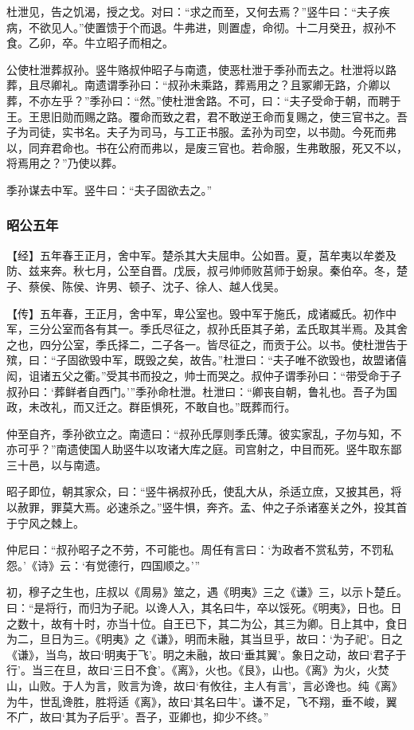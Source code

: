 \documentclass[]{article}
\begin{document}
杜泄见，告之饥渴，授之戈。对曰：``求之而至，又何去焉？''竖牛曰：``夫子疾病，不欲见人。''使置馈于个而退。牛弗进，则置虚，命彻。十二月癸丑，叔孙不食。乙卯，卒。牛立昭子而相之。

公使杜泄葬叔孙。竖牛赂叔仲昭子与南遗，使恶杜泄于季孙而去之。杜泄将以路葬，且尽卿礼。南遗谓季孙曰：``叔孙未乘路，葬焉用之？且冢卿无路，介卿以葬，不亦左乎？''季孙曰：``然。''使杜泄舍路。不可，曰：``夫子受命于朝，而聘于王。王思旧勋而赐之路。覆命而致之君，君不敢逆王命而复赐之，使三官书之。吾子为司徒，实书名。夫子为司马，与工正书服。孟孙为司空，以书勋。今死而弗以，同弃君命也。书在公府而弗以，是废三官也。若命服，生弗敢服，死又不以，将焉用之？''乃使以葬。

季孙谋去中军。竖牛曰：``夫子固欲去之。''

\hypertarget{header-n2443}{%
\subsubsection{昭公五年}\label{header-n2443}}

【经】五年春王正月，舍中军。楚杀其大夫屈申。公如晋。夏，莒牟夷以牟娄及防、兹来奔。秋七月，公至自晋。戊辰，叔弓帅师败莒师于蚡泉。秦伯卒。冬，楚子、蔡侯、陈侯、许男、顿子、沈子、徐人、越人伐吴。

【传】五年春，王正月，舍中军，卑公室也。毁中军于施氏，成诸臧氏。初作中军，三分公室而各有其一。季氏尽征之，叔孙氏臣其子弟，孟氏取其半焉。及其舍之也，四分公室，季氏择二，二子各一。皆尽征之，而贡于公。以书。使杜泄告于殡，曰：``子固欲毁中军，既毁之矣，故告。''杜泄曰：``夫子唯不欲毁也，故盟诸僖闳，诅诸五父之衢。''受其书而投之，帅士而哭之。叔仲子谓季孙曰：``带受命于子叔孙曰：`葬鲜者自西门。'''季孙命杜泄。杜泄曰：``卿丧自朝，鲁礼也。吾子为国政，未改礼，而又迁之。群臣惧死，不敢自也。''既葬而行。

仲至自齐，季孙欲立之。南遗曰：``叔孙氏厚则季氏薄。彼实家乱，子勿与知，不亦可乎？''南遗使国人助竖牛以攻诸大库之庭。司宫射之，中目而死。竖牛取东鄙三十邑，以与南遗。

昭子即位，朝其家众，曰：``竖牛祸叔孙氏，使乱大从，杀适立庶，又披其邑，将以赦罪，罪莫大焉。必速杀之。''竖牛惧，奔齐。孟、仲之子杀诸塞关之外，投其首于宁风之棘上。

仲尼曰：``叔孙昭子之不劳，不可能也。周任有言曰：`为政者不赏私劳，不罚私怨。'《诗》云：`有觉德行，四国顺之。'''

初，穆子之生也，庄叔以《周易》筮之，遇《明夷》三之《谦》三，以示卜楚丘。曰：``是将行，而归为子祀。以谗人入，其名曰牛，卒以馁死。《明夷》，日也。日之数十，故有十时，亦当十位。自王已下，其二为公，其三为卿。日上其中，食日为二，旦日为三。《明夷》之《谦》，明而未融，其当旦乎，故曰：`为子祀'。日之《谦》，当鸟，故曰`明夷于飞'。明之未融，故曰`垂其翼'。象日之动，故曰`君子于行'。当三在旦，故曰`三日不食'。《离》，火也。《艮》，山也。《离》为火，火焚山，山败。于人为言，败言为谗，故曰`有攸往，主人有言'，言必谗也。纯《离》为牛，世乱谗胜，胜将适《离》，故曰`其名曰牛'。谦不足，飞不翔，垂不峻，翼不广，故曰`其为子后乎'。吾子，亚卿也，抑少不终。''
\end{document}
